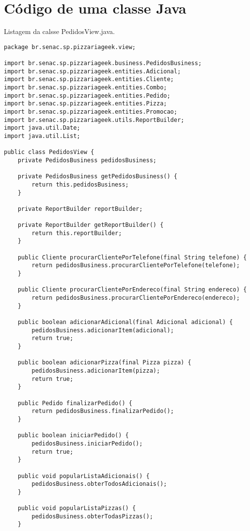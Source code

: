 \section{Código de uma classe Java}

Listagem da calsse PedidosView.java.
\newline
\begin{lstlisting}
package br.senac.sp.pizzariageek.view;

import br.senac.sp.pizzariageek.business.PedidosBusiness;
import br.senac.sp.pizzariageek.entities.Adicional;
import br.senac.sp.pizzariageek.entities.Cliente;
import br.senac.sp.pizzariageek.entities.Combo;
import br.senac.sp.pizzariageek.entities.Pedido;
import br.senac.sp.pizzariageek.entities.Pizza;
import br.senac.sp.pizzariageek.entities.Promocao;
import br.senac.sp.pizzariageek.utils.ReportBuilder;
import java.util.Date;
import java.util.List;

public class PedidosView {
    private PedidosBusiness pedidosBusiness;

    private PedidosBusiness getPedidosBusiness() {
        return this.pedidosBusiness;
    }

    private ReportBuilder reportBuilder;

    private ReportBuilder getReportBuilder() {
        return this.reportBuilder;
    }

    public Cliente procurarClientePorTelefone(final String telefone) {
        return pedidosBusiness.procurarClientePorTelefone(telefone);
    }

    public Cliente procurarClientePorEndereco(final String endereco) {
        return pedidosBusiness.procurarClientePorEndereco(endereco);
    }

    public boolean adicionarAdicional(final Adicional adicional) {
        pedidosBusiness.adicionarItem(adicional);
        return true;
    }

    public boolean adicionarPizza(final Pizza pizza) {
        pedidosBusiness.adicionarItem(pizza);
        return true;
    }

    public Pedido finalizarPedido() {
        return pedidosBusiness.finalizarPedido();
    }

    public boolean iniciarPedido() {
        pedidosBusiness.iniciarPedido();
        return true;
    }

    public void popularListaAdicionais() {
        pedidosBusiness.obterTodosAdicionais();
    }

    public void popularListaPizzas() {
        pedidosBusiness.obterTodasPizzas();
    }


\end{lstlisting}
